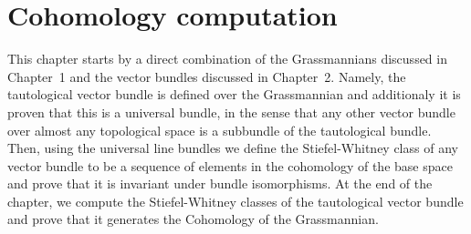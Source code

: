 \chapter{Cohomology computation}
This chapter starts by a direct combination of the Grassmannians discussed in Chapter~1 and the vector bundles discussed in Chapter~2. Namely, the tautological vector bundle is defined over the Grassmannian and additionaly it is proven that this is a universal bundle, in the sense that any other vector bundle over almost any topological space is a subbundle of the tautological bundle. Then, using the universal line bundles we define the Stiefel-Whitney class of any vector bundle to be a sequence of elements in the cohomology of the base space and prove that it is invariant under bundle isomorphisms. At the end of the chapter, we compute the Stiefel-Whitney classes of the tautological vector bundle and prove that it generates the Cohomology of the Grassmannian.

